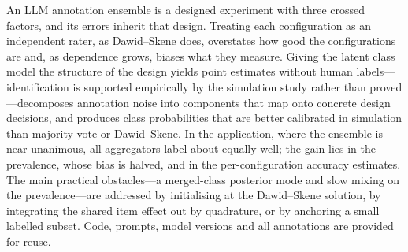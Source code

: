 An LLM annotation ensemble is a designed experiment with three crossed factors, and its errors inherit that design. Treating each configuration as an independent rater, as Dawid--Skene does, overstates how good the configurations are and, as dependence grows, biases what they measure. Giving the latent class model the structure of the design yields point estimates without human labels---identification is supported empirically by the simulation study rather than proved---decomposes annotation noise into components that map onto concrete design decisions, and produces class probabilities that are better calibrated in simulation than majority vote or Dawid--Skene. In the application, where the ensemble is near-unanimous, all aggregators label about equally well; the gain lies in the prevalence, whose bias is halved, and in the per-configuration accuracy estimates. The main practical obstacles---a merged-class posterior mode and slow mixing on the prevalence---are addressed by initialising at the Dawid--Skene solution, by integrating the shared item effect out by quadrature, or by anchoring a small labelled subset. Code, prompts, model versions and all annotations are provided for reuse.
